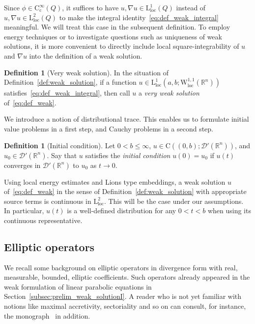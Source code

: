 \documentclass[11pt, leqno]{amsart}
\theoremstyle{definition}
\newtheorem{definition}[theorem]{Definition}
\newcommand{\R}{\mathbb{R}}
\renewcommand{\L}{\mathrm{L}}
\newcommand{\W}{\mathrm{W}}
\newcommand{\cD}{\mathcal{D}}
\newcommand{\Cont}{\mathrm{C}}
\newcommand{\cc}{\mathrm{c}}
\newcommand{\loc}{\mathrm{loc}}
\begin{document}
	Since $\phi \in \Cont^\infty_\cc(Q)$, it suffices to have $u, \nabla u \in \L^1_\loc(Q)$ instead of $u, \nabla u \in \L^2_\loc(Q)$ to make the integral identity~\eqref{eq:def_weak_integral} meaningful.
	We will treat this case in the subsequent definition.
	To employ energy techniques or to investigate questions such as uniqueness of weak solutions, it is more convenient to directly include local square-integrability of $u$ and $\nabla u$ into the definition of a weak solution.

	\begin{definition}[Very weak solution]
		\label{def:very_weak_solution}
		In the situation of Definition~\ref{def:weak_solution}, if a function $u\in \L^1_\loc(a,b; \W^{1,1}_\loc(\R^n))$ satisfies~\eqref{eq:def_weak_integral}, then call $u$ a \emph{very weak solution} of~\eqref{eq:def_weak}.
	\end{definition}

	We introduce a notion of distributional trace. This enables us to formulate initial value problems in a first step, and Cauchy problems in a second step.

	\begin{definition}[Initial condition]
		\label{def:initial_condition}
		Let $0 < b \leq \infty$, $u \in \Cont({(0,b)}; \cD'(\R^n))$, and $u_0 \in \cD'(\R^n)$. Say that $u$ satisfies the \emph{initial condition} $u(0) = u_0$ if $u(t)$ converges in $\cD'(\R^n)$ to $u_0$ as $t\to 0$.
	\end{definition}


	Using local energy estimates and Lions type embeddings, a weak solution $u$ of~\eqref{eq:def_weak} in the sense of Definition~\ref{def:weak_solution} with appropriate source terms is continuous in $\L^2_\loc$. This will be the case under our assumptions. In particular, $u(t)$ is a well-defined distribution for any $0 < t < b$ when using its continuous representative.

	\subsection{Elliptic operators}
	\label{subsec:prelim_elliptic}

	We recall some background on elliptic operators in divergence form with real, measurable, bounded, elliptic coefficients. Such operators already appeared in the weak formulation of linear parabolic equations in Section~\ref{subsec:prelim_weak_solutionI}.
	A reader who is not yet familiar with notions like maximal accretivity, sectoriality and so on can consult, for instance, the monograph~\cite{Haase} in addition.
\end{document}
